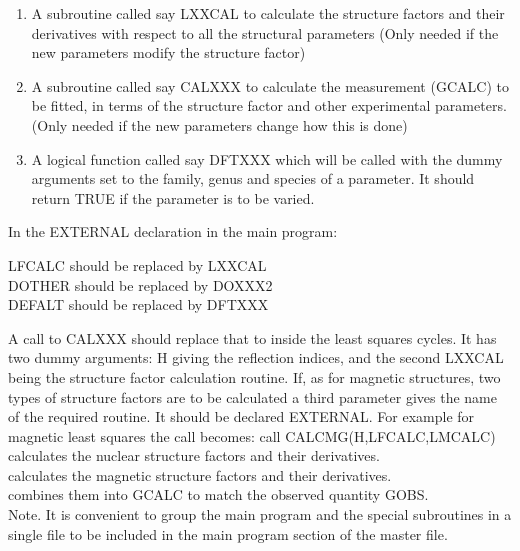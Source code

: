 \begin{enumerate}
\begin{description}
\end{description}     
\item  A subroutine called say LXXCAL to calculate the structure factors
             and their derivatives with respect to all the structural parameters
             (Only needed if the new parameters modify the structure factor)
\item   A subroutine called say CALXXX to calculate the measurement (GCALC)
             to be fitted, in terms of the structure factor and other
             experimental parameters.
             (Only needed if the new parameters change how this is done)
\item   A logical function called say DFTXXX which will be called  with
             the dummy arguments set to the family, genus and species of a 
             parameter. It should return TRUE if the parameter is to be varied.
\end{enumerate}             
        In the EXTERNAL declaration in the main program:

\begin{varindent}{3 cm}
                       LFCALC should be replaced by LXXCAL\\ 
                       DOTHER should be replaced by DOXXX2\\ 
                       DEFALT should be replaced by DFTXXX\\
\end{varindent} 
\par                      
        A call to CALXXX should replace that to  inside the least squares
        cycles. It has two dummy arguments: H giving the reflection indices, 
        and the second LXXCAL being the structure factor calculation routine.      
        If, as for magnetic structures, two types of structure factors are to
        be calculated a third parameter gives the name of the required routine.
        It should be declared EXTERNAL. 
        For example for magnetic least squares the call becomes:
        call CALCMG(H,LFCALC,LMCALC)\\
         calculates the nuclear structure factors and their
        derivatives.\\
         calculates the magnetic structure factors and their
        derivatives.\\
         combines them into GCALC to match the observed quantity GOBS.\\ 
\p        
        Note. It is convenient to group the main program and the 
        special subroutines in a single file to be included in the main program
        section of the master file.
%        
